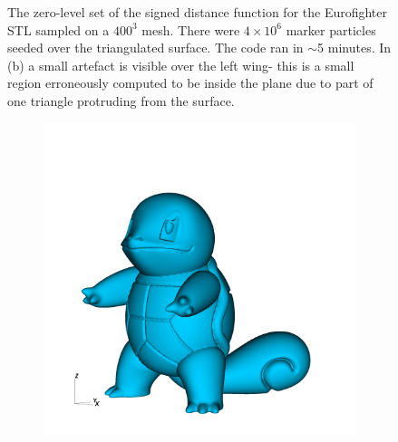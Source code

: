 \documentclass[final,3p,times,twocolumn]{elsarticle}
\begin{document}
\begin{figure}
\begin{subfigure}[b]{0.475\textwidth}
            \caption{}
            \label{ef4}
        \end{subfigure}
        \caption{The zero-level set of the signed distance function for the Eurofighter STL sampled on a $400^3$ mesh. There were $4\times 10^6$ marker particles seeded over the triangulated surface. The code ran in $\sim$5 minutes. In (b) a small artefact is visible over the left wing- this is a small region erroneously computed to be inside the plane due to part of one triangle protruding from
        the surface.}
        \label{EF}
\end{figure}

\begin{figure}
\centering
        \begin{subfigure}[b]{0.475\textwidth}
            \centering
            \includegraphics[width=\textwidth]{visit0018.png}
            \caption{}    
            \label{ef1}
        \end{subfigure}
        \hfill
        \begin{subfigure}[b]{0.475\textwidth}  
            \centering 

\end{subfigure}
\end{figure}
\end{document}
